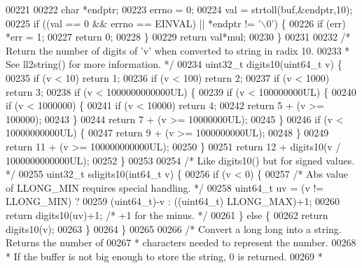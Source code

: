 \begin{DoxyCode}
00221 
00222     \textcolor{keywordtype}{char} *endptr;
00223     errno = 0;
00224     val = strtoll(buf,&endptr,10);
00225     \textcolor{keywordflow}{if} ((val == 0 && errno == EINVAL) || *endptr != \textcolor{stringliteral}{'\(\backslash\)0'}) \{
00226         \textcolor{keywordflow}{if} (err) *err = 1;
00227         \textcolor{keywordflow}{return} 0;
00228     \}
00229     \textcolor{keywordflow}{return} val*mul;
00230 \}
00231 
00232 \textcolor{comment}{/* Return the number of digits of 'v' when converted to string in radix 10.}
00233 \textcolor{comment}{ * See ll2string() for more information. */}
00234 uint32\_t digits10(uint64\_t v) \{
00235     \textcolor{keywordflow}{if} (v < 10) \textcolor{keywordflow}{return} 1;
00236     \textcolor{keywordflow}{if} (v < 100) \textcolor{keywordflow}{return} 2;
00237     \textcolor{keywordflow}{if} (v < 1000) \textcolor{keywordflow}{return} 3;
00238     \textcolor{keywordflow}{if} (v < 1000000000000UL) \{
00239         \textcolor{keywordflow}{if} (v < 100000000UL) \{
00240             \textcolor{keywordflow}{if} (v < 1000000) \{
00241                 \textcolor{keywordflow}{if} (v < 10000) \textcolor{keywordflow}{return} 4;
00242                 \textcolor{keywordflow}{return} 5 + (v >= 100000);
00243             \}
00244             \textcolor{keywordflow}{return} 7 + (v >= 10000000UL);
00245         \}
00246         \textcolor{keywordflow}{if} (v < 10000000000UL) \{
00247             \textcolor{keywordflow}{return} 9 + (v >= 1000000000UL);
00248         \}
00249         \textcolor{keywordflow}{return} 11 + (v >= 100000000000UL);
00250     \}
00251     \textcolor{keywordflow}{return} 12 + digits10(v / 1000000000000UL);
00252 \}
00253 
00254 \textcolor{comment}{/* Like digits10() but for signed values. */}
00255 uint32\_t sdigits10(int64\_t v) \{
00256     \textcolor{keywordflow}{if} (v < 0) \{
00257         \textcolor{comment}{/* Abs value of LLONG\_MIN requires special handling. */}
00258         uint64\_t uv = (v != LLONG\_MIN) ?
00259                       (uint64\_t)-v : ((uint64\_t) LLONG\_MAX)+1;
00260         \textcolor{keywordflow}{return} digits10(uv)+1; \textcolor{comment}{/* +1 for the minus. */}
00261     \} \textcolor{keywordflow}{else} \{
00262         \textcolor{keywordflow}{return} digits10(v);
00263     \}
00264 \}
00265 
00266 \textcolor{comment}{/* Convert a long long into a string. Returns the number of}
00267 \textcolor{comment}{ * characters needed to represent the number.}
00268 \textcolor{comment}{ * If the buffer is not big enough to store the string, 0 is returned.}
00269 \textcolor{comment}{ *}

\end{DoxyCode}
